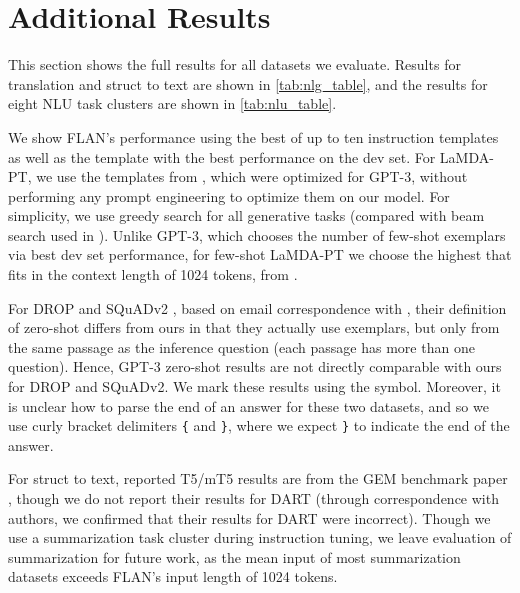 \documentclass{article} \usepackage{iclr2022_conference,times}
\newcommand{\flan}{FLAN}
\newcommand{\baselm}{LaMDA-PT}
\begin{document}
\clearpage 



\newpage 
\appendix

\newcommand{\trainsize}[0]{30,000}
\newcommand{\devsize}[0]{200}

\section{Additional Results}\label{sec:supp_all_results}




This section shows the full results for all datasets we evaluate.
Results for translation and struct to text are shown in \cref{tab:nlg_table}, and the results for eight NLU task clusters are shown in \cref{tab:nlu_table}.

We show FLAN's performance using the best of up to ten instruction templates as well as the template with the best performance on the dev set. 
For \baselm{}, we use the templates from \citet{brown2020language}, which were optimized for GPT-3, without performing any prompt engineering to optimize them on our model. 
For simplicity, we use greedy search for all generative tasks (compared with beam search used in \citet{brown2020language}). 
Unlike GPT-3, which chooses the number of few-shot exemplars  via best dev set performance, for few-shot \baselm{} we choose the highest  that fits in the context length of 1024 tokens, from . 

For DROP \citep{Dua2019DROP} and SQuADv2 \citep{rajpurkar-etal-2018-know}, based on email correspondence with \citet{brown2020language}, their definition of zero-shot differs from ours in that they actually use exemplars, but only from the same passage as the inference question (each passage has more than one question). 
Hence, GPT-3 zero-shot results are not directly comparable with ours for DROP and SQuADv2.
We mark these results using the  symbol.
Moreover, it is unclear how to parse the end of an answer for these two datasets, and so we use curly bracket delimiters \texttt{\{} and \texttt{\}}, where we expect \texttt{\}} to indicate the end of the answer.

For struct to text, reported T5/mT5 results are from the GEM benchmark paper \citep{gehrmann2021gem}, though we do not report their results for DART (through correspondence with authors, we confirmed that their results for DART were incorrect). 
Though we use a summarization task cluster during instruction tuning, we leave evaluation of summarization for future work, as the mean input of most summarization datasets exceeds \flan's input length of 1024 tokens.
\end{document}
